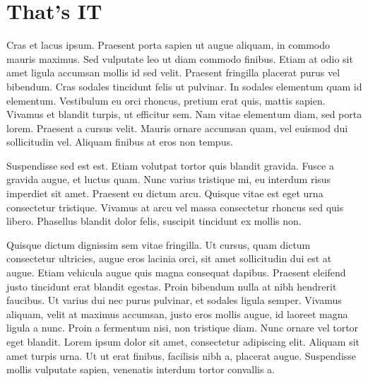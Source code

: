\documentclass[../../main.tex]{subfiles}
\begin{document}
\chapter{That's IT}

Cras et lacus ipsum. Praesent porta sapien ut augue aliquam, in commodo mauris maximus. Sed vulputate leo ut diam commodo finibus. Etiam at odio sit amet ligula accumsan mollis id sed velit. Praesent fringilla placerat purus vel bibendum. Cras sodales tincidunt felis ut pulvinar. In sodales elementum quam id elementum. Vestibulum eu orci rhoncus, pretium erat quis, mattis sapien. Vivamus et blandit turpis, ut efficitur sem. Nam vitae elementum diam, sed porta lorem. Praesent a cursus velit. Mauris ornare accumsan quam, vel euismod dui sollicitudin vel. Aliquam finibus at eros non tempus.

Suspendisse sed est est. Etiam volutpat tortor quis blandit gravida. Fusce a gravida augue, et luctus quam. Nunc varius tristique mi, eu interdum risus imperdiet sit amet. Praesent eu dictum arcu. Quisque vitae est eget urna consectetur tristique. Vivamus at arcu vel massa consectetur rhoncus sed quis libero. Phasellus blandit dolor felis, suscipit tincidunt ex mollis non.

Quisque dictum dignissim sem vitae fringilla. Ut cursus, quam dictum consectetur ultricies, augue eros lacinia orci, sit amet sollicitudin dui est at augue. Etiam vehicula augue quis magna consequat dapibus. Praesent eleifend justo tincidunt erat blandit egestas. Proin bibendum nulla at nibh hendrerit faucibus. Ut varius dui nec purus pulvinar, et sodales ligula semper. Vivamus aliquam, velit at maximus accumsan, justo eros mollis augue, id laoreet magna ligula a nunc. Proin a fermentum nisi, non tristique diam. Nunc ornare vel tortor eget blandit. Lorem ipsum dolor sit amet, consectetur adipiscing elit. Aliquam sit amet turpis urna. Ut ut erat finibus, facilisis nibh a, placerat augue. Suspendisse mollis vulputate sapien, venenatis interdum tortor convallis a.
\end{document}
